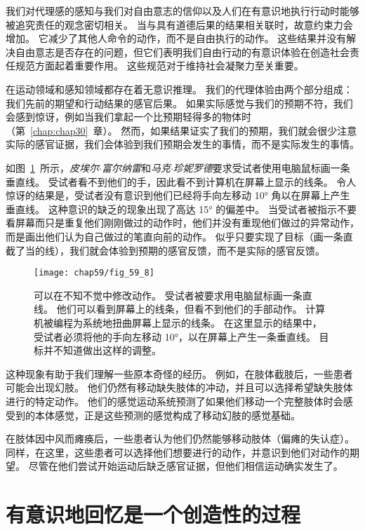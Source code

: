 我们对代理感的感知与我们对自由意志的信仰以及人们在有意识地执行行动时能够被追究责任的观念密切相关。
当与具有道德后果的结果相关联时，故意约束力会增加。
它减少了其他人命令的动作，而不是自由执行的动作。
这些结果并没有解决自由意志是否存在的问题，但它们表明我们自由行动的有意识体验在创造社会责任规范方面起着重要作用。
这些规范对于维持社会凝聚力至关重要。


在运动领域和感知领域都存在着无意识推理。
我们的代理体验由两个部分组成：
我们先前的期望和行动结果的感官后果。
如果实际感觉与我们的预期不符，我们会感到惊讶，例如当我们拿起一个比预期轻得多的物体时（第~\ref{chap:chap30}~章）。
然而，如果结果证实了我们的预期，我们就会很少注意实际的感官证据，我们会体验到我们预期会发生的事情，而不是实际发生的事情。


如图~\ref{fig:59_8}~所示，\textit{皮埃尔$\cdot$富尔纳雷}和\textit{马克$\cdot$珍妮罗德}要求受试者使用电脑鼠标画一条垂直线。
受试者看不到他们的手，因此看不到计算机在屏幕上显示的线条。
令人惊讶的结果是，受试者没有意识到他们已经将手向左移动 10° 角以在屏幕上产生垂直线。
这种意识的缺乏的现象出现了高达 15° 的偏差中。
当受试者被指示不要看屏幕而只是重复他们刚刚做过的动作时，他们并没有重现他们做过的异常动作，而是画出他们认为自己做过的笔直向前的动作。
似乎只要实现了目标（画一条直截了当的线），我们就会体验到预期的感官反馈，而不是实际的感官反馈。


\begin{figure}[htbp]
	\centering
	\texttt{[image: chap59/fig\_59\_8]}
	\caption{可以在不知不觉中修改动作。
		受试者被要求用电脑鼠标画一条直线。
		他们可以看到屏幕上的线条，但看不到他们的手部动作。
		计算机被编程为系统地扭曲屏幕上显示的线条。
		在这里显示的结果中，受试者必须将他的手向左移动 10°，以在屏幕上产生一条垂直线。
		目标并不知道做出这样的调整\cite{fourneret1998limited}。}
	\label{fig:59_8}
\end{figure}


这种现象有助于我们理解一些原本奇怪的经历。
例如，在肢体截肢后，一些患者可能会出现幻肢。
他们仍然有移动缺失肢体的冲动，并且可以选择希望缺失肢体进行的特定动作。
他们的感觉运动系统预测了如果他们移动一个完整肢体时会感受到的本体感觉，正是这些预测的感觉构成了移动幻肢的感觉基础。


在肢体因中风而瘫痪后，一些患者认为他们仍然能够移动肢体（偏瘫的失认症）。
同样，在这里，这些患者可以选择他们想要进行的动作，并意识到他们对动作的期望。
尽管在他们尝试开始运动后缺乏感官证据，但他们相信运动确实发生了。



\section{有意识地回忆是一个创造性的过程}

